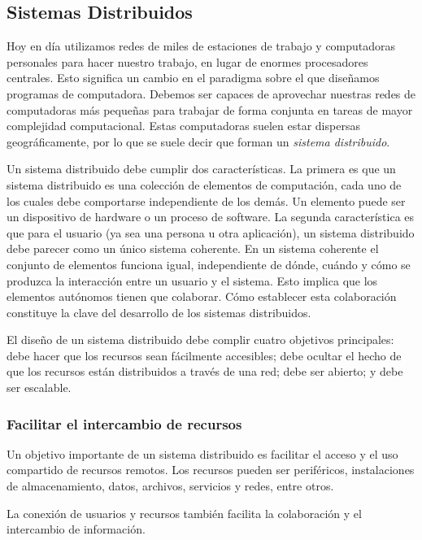 \documentclass[conference,compsoc]{IEEEtran}
\begin{document}
\subsection{Sistemas Distribuidos}

Hoy en día utilizamos redes de miles de estaciones de trabajo y computadoras personales para hacer nuestro trabajo, en lugar de enormes procesadores centrales.
Esto significa un cambio en el paradigma sobre el que diseñamos programas de computadora. Debemos ser capaces de aprovechar nuestras redes de computadoras más pequeñas para trabajar de forma conjunta en tareas de mayor complejidad computacional.\cite{farley_1998} Estas computadoras suelen estar dispersas geográficamente, por lo que se suele decir que forman un \emph{sistema distribuido}. \cite{steen_tanenbaum_2017}

Un sistema distribuido debe cumplir dos características. La primera es que un sistema distribuido es una colección de elementos de computación, cada uno de los cuales debe comportarse independiente de los demás. Un elemento puede ser un dispositivo de hardware o un proceso de software. La segunda característica es que para el usuario (ya sea una persona u otra aplicación), un sistema distribuido debe parecer como un único sistema coherente. En un sistema coherente el conjunto de elementos funciona igual, independiente de dónde, cuándo y cómo se produzca la interacción entre un usuario y el sistema. Esto implica que los elementos autónomos tienen que colaborar. Cómo establecer esta colaboración constituye la clave del desarrollo de los sistemas distribuidos.\cite{steen_tanenbaum_2017}

El diseño de un sistema distribuido debe complir cuatro objetivos principales: debe hacer que los recursos sean fácilmente accesibles; debe ocultar el hecho de que los recursos están distribuidos a través de una red; debe ser abierto; y debe ser escalable. \cite{steen_tanenbaum_2017}

\subsubsection{Facilitar el intercambio de recursos}

Un objetivo importante de un sistema distribuido es facilitar el acceso y el uso compartido de recursos remotos. Los recursos pueden ser periféricos, instalaciones de almacenamiento, datos, archivos, servicios y redes, entre otros.

La conexión de usuarios y recursos también facilita la colaboración y el intercambio de información.
\end{document}
